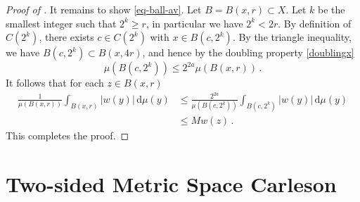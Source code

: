 \begin{proof}[Proof of ]
It remains to show \eqref{eq-ball-av}. Let $B = B(x, r) \subset X$. Let $k$ be the smallest integer such that $2^k \ge r$, in particular we have $2^k < 2r$. By definition of $C(2^k)$, there exists $c \in C(2^k)$ with $x \in B(c, 2^k)$. By the triangle inequality, we have $B(c, 2^k) \subset B(x, 4r)$, and hence by the doubling property \eqref{doublingx}
$$
    \mu(B(c, 2^k)) \le 2^{2a} \mu(B(x,r))\,.
$$
It follows that for each $z \in B(x,r)$
\begin{align*}
    \frac{1}{\mu(B(x,r))}\int_{B(x,r)} |w(y)| \, \mathrm{d}\mu(y) &\le \frac{2^{2a}}{\mu(B(c,2^k))}\int_{B(c,2^k)} |w(y)| \, \mathrm{d}\mu(y) \\
    &\le Mw(z)\,.
\end{align*}
This completes the proof.
\end{proof}

\chapter{Two-sided Metric Space Carleson}

